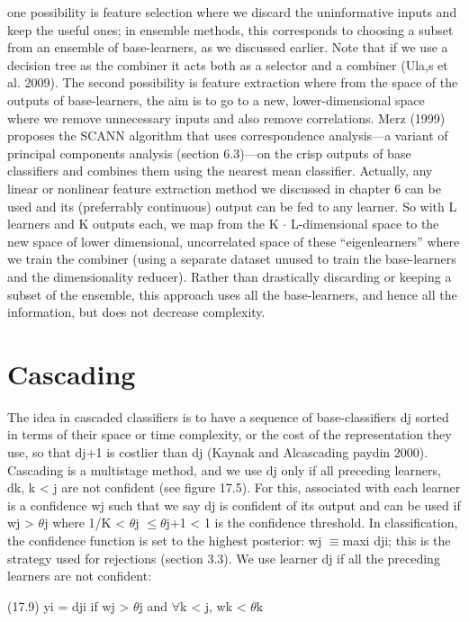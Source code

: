 one possibility is feature selection where we discard the uninformative inputs and keep the useful ones; in ensemble methods, this corresponds to choosing a subset from an ensemble of base-learners, as we discussed earlier. Note that if we use a decision tree as the combiner it acts both as a selector and a combiner (Ula,s et al. 2009). The second possibility is feature extraction where from the space of the outputs of base-learners, the aim is to go to a new, lower-dimensional space where we remove unnecessary inputs and also remove correlations. Merz (1999) proposes the SCANN algorithm that uses correspondence analysis---a variant of principal components analysis (section 6.3)---on the crisp outputs of base classifiers and combines them using the nearest mean classifier. Actually, any linear or nonlinear feature extraction method we discussed in chapter 6 can be used and its (preferrably continuous) output can be fed to any learner. So with L learners and K outputs each, we map from the K $\cdot$ L-dimensional space to the new space of lower dimensional, uncorrelated space of these “eigenlearners” where we train the combiner (using a separate dataset unused to train the base-learners and the dimensionality reducer). Rather than drastically discarding or keeping a subset of the ensemble, this approach uses all the base-learners, and hence all the information, but does not decrease complexity.

\section{Cascading}

The idea in cascaded classifiers is to have a sequence of base-classifiers dj sorted in terms of their space or time complexity, or the cost of the representation they use, so that dj+1 is costlier than dj (Kaynak and Alcascading paydin 2000). Cascading is a multistage method, and we use dj only if all preceding learners, dk, k < j are not confident (see figure 17.5). For this, associated with each learner is a confidence wj such that we say dj is confident of its output and can be used if wj > $\theta$j where 1/K < $\theta$j $\leq$$\theta$j+1 < 1 is the confidence threshold. In classification, the confidence function is set to the highest posterior: wj $\equiv$maxi dji; this is the strategy used for rejections (section 3.3). We use learner dj if all the preceding learners are not confident:

(17.9) yi = dji if wj > $\theta$j and $\forall$k < j, wk < $\theta$k

